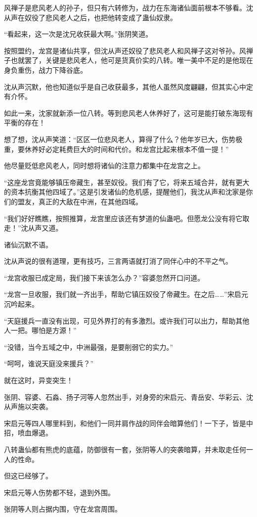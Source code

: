 \begin{this_body}
风禅子是悲风老人的孙子，但只有六转修为，战力在东海诸仙面前根本不够看。沈从声在奴役了悲风老人之后，也把他转变成了蛊仙奴隶。

“看起来，这一次是沈兄收获最大啊。”张阴笑道。

按照盟约，龙宫是诸仙共享，但沈从声还奴役了悲风老人和风禅子这对爷孙。风禅子也就罢了，关键是悲风老人，他可是货真价实的八转。唯一美中不足的是他现在身负重伤，战力下降谷底。

沈从声沉默，他也知道似乎是自己收获最多，其他人虽然风度翩翩，但其实心中定有介怀。

如此一来，沈家就新添一位八转。等到悲风老人休养好了，这可是能打破东海现有平衡的存在！

想了想，沈从声笑道：“区区一位悲风老人，算得了什么？他年岁已大，伤势极重，要休养好必定耗费巨大的时间和代价。和龙宫比起来根本不值一提！”

他尽量贬低悲风老人，同时想将诸仙的注意力都集中在龙宫之上。

“这座龙宫竟能够镇压帝藏生，甚至奴役。我们有了它，将来五域合并，就有更大的资本抗衡其他四域了。”这是引发诸仙的危机感，提醒他们，我沈从声和沈家是你们的盟友，真正的大敌在中洲，在其他四域。

“我们好好瞧瞧，按照推算，龙宫里应该还有梦道的仙蛊吧。但愿龙公没有将它取走！”沈从声又道。

诸仙沉默不语。

沈从声说的很有道理，更有技巧，三言两语就打消了同伴心中的不平之气。

“龙宫收服已成定局，我们接下来该怎么办？”容婆忽然开口问道。

“龙宫一旦收服，我们就一齐出手，帮助它镇压奴役了帝藏生。在之后……”宋启元沉吟起来。

“天庭援兵一直没有出现，可见外界打的有多激烈。或许我们可以出力，帮助其他人一把。哪怕是方源！”

“没错，当今五域之中，中洲最强，是要削弱它的实力。”

“呵呵，谁说天庭没来援兵？”

就在这时，异变突生！

张阴、容婆、石淼、扬子河等人忽然出手，对身旁的宋启元、青岳安、华彩云、沈从声施以突袭。

宋启元等四人哪里料到，和他们一同并肩作战的同伴会暗算他们！一下子，皆是中招，喷血爆退。

八转蛊仙都有熊虎的底蕴，防御很有一套，张阴等人的突袭暗算，并未取走任何一人的性命。

但这已经够了。

宋启元等人伤势都不轻，退到外围。

张阴等人则占据内围，守在龙宫周围。


\end{this_body}
